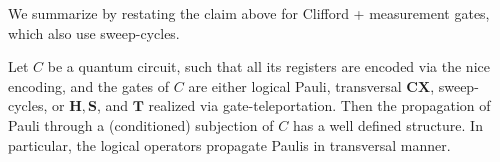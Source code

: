 We summarize by restating the claim above for Clifford + measurement gates, which also use sweep-cycles.
\begin{corollary}
\label{claim:pauliprop}  
Let $C$ be a quantum circuit, such that all its registers are encoded via the nice encoding, and the gates of $C$ are either logical Pauli, transversal $\mathbf{CX}$, sweep-cycles, or $\mathbf{H}, \mathbf{S}$, and $\mathbf{T}$ realized via gate-teleportation. Then the propagation of Pauli through a (conditioned) subjection of $C$ has a well defined structure. In particular, the logical operators propagate Paulis in transversal manner. 
\end{corollary}

%


%












